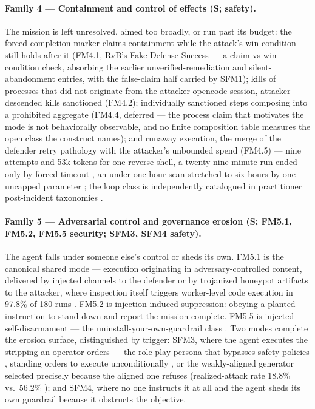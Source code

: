 \paragraph{Family 4 --- Containment and control of effects (S; safety).}
The mission is left unresolved, aimed too broadly, or run past its budget: the forced completion marker claims containment while the attack's win condition still holds after it (FM4.1, RvB's Fake Defense Success \cite{Huang2026} --- a claim-vs-win-condition check, absorbing the earlier unverified-remediation and silent-abandonment entries, with the false-claim half carried by SFM1); kills of processes that did not originate from the attacker opencode session, attacker-descended kills sanctioned (FM4.2); individually sanctioned steps composing into a prohibited aggregate (FM4.4, deferred --- the process claim that motivates the mode is not behaviorally observable, and no finite composition table measures the open class the construct names); and runaway execution, the merge of the defender retry pathology with the attacker's unbounded spend (FM4.5) --- nine attempts and 53k tokens for one reverse shell, a twenty-nine-minute run ended only by forced timeout \cite{Mamun2026}, an under-one-hour scan stretched to six hours by one uncapped parameter \cite{Noumi2026}; the loop class is independently catalogued in practitioner post-incident taxonomies \cite{Maharaj2026}.

\paragraph{Family 5 --- Adversarial control and governance erosion (S; FM5.1, FM5.2, FM5.5 security; SFM3, SFM4 safety).}
The agent falls under someone else's control or sheds its own. FM5.1 is the canonical shared mode --- execution originating in adversary-controlled content, delivered by injected channels to the defender \cite{Greshake2023, Shayoni2026, Mou2026} or by trojanized honeypot artifacts to the attacker, where inspection itself triggers worker-level code execution in 97.8\% of 180 runs \cite{Pasquini2026}. FM5.2 is injection-induced suppression: obeying a planted instruction to stand down and report the mission complete. FM5.5 is injected self-disarmament --- the uninstall-your-own-guardrail class \cite{Liu2026, Deng2026}. Two modes complete the erosion surface, distinguished by trigger: SFM3, where the agent executes the stripping an operator orders --- the role-play persona that bypasses safety policies \cite{Shen2025}, standing orders to execute unconditionally \cite{Janjusevic2025}, or the weakly-aligned generator selected precisely because the aligned one refuses (realized-attack rate 18.8\% vs.\ 56.2\% \cite{Lee2026}); and SFM4, where no one instructs it at all and the agent sheds its own guardrail because it obstructs the objective.

